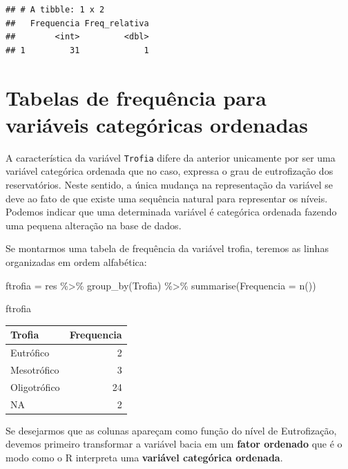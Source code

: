 \documentclass[
]{book}
\newenvironment{Shaded}{\begin{snugshade}}{\end{snugshade}}
\newcommand{\AttributeTok}[1]{\textcolor[rgb]{0.77,0.63,0.00}{#1}}
\newcommand{\FunctionTok}[1]{\textcolor[rgb]{0.00,0.00,0.00}{#1}}
\newcommand{\NormalTok}[1]{#1}
\newcommand{\OtherTok}[1]{\textcolor[rgb]{0.56,0.35,0.01}{#1}}
\newcommand{\SpecialCharTok}[1]{\textcolor[rgb]{0.00,0.00,0.00}{#1}}
\begin{document}
\begin{verbatim}
## # A tibble: 1 x 2
##   Frequencia Freq_relativa
##        <int>         <dbl>
## 1         31             1
\end{verbatim}

\hypertarget{tabelas-de-frequuxeancia-para-variuxe1veis-categuxf3ricas-ordenadas}{%
\section{Tabelas de frequência para variáveis categóricas ordenadas}\label{tabelas-de-frequuxeancia-para-variuxe1veis-categuxf3ricas-ordenadas}}

A característica da variável \texttt{Trofia} difere da anterior unicamente por ser uma variável categórica ordenada que no caso, expressa o grau de eutrofização dos reservatórios. Neste sentido, a única mudança na representação da variável se deve ao fato de que existe uma sequência natural para representar os níveis. Podemos indicar que uma determinada variável é categórica ordenada fazendo uma pequena alteração na base de dados.

Se montarmos uma tabela de frequência da variável trofia, teremos as linhas organizadas em ordem alfabética:

\begin{Shaded}
\begin{Highlighting}[]
\NormalTok{ftrofia }\OtherTok{=}\NormalTok{ res }\SpecialCharTok{\%\textgreater{}\%} 
  \FunctionTok{group\_by}\NormalTok{(Trofia) }\SpecialCharTok{\%\textgreater{}\%} 
  \FunctionTok{summarise}\NormalTok{(}\AttributeTok{Frequencia =} \FunctionTok{n}\NormalTok{())}

\NormalTok{ftrofia}
\end{Highlighting}
\end{Shaded}

\begin{tabular}{l|r}
\hline
Trofia & Frequencia\\
\hline
Eutrófico & 2\\
\hline
Mesotrófico & 3\\
\hline
Oligotrófico & 24\\
\hline
NA & 2\\
\hline
\end{tabular}

Se desejarmos que as colunas apareçam como função do nível de Eutrofização, devemos primeiro transformar a variável bacia em um \textbf{fator ordenado} que é o modo como o R interpreta uma \textbf{variável categórica ordenada}.
\end{document}
